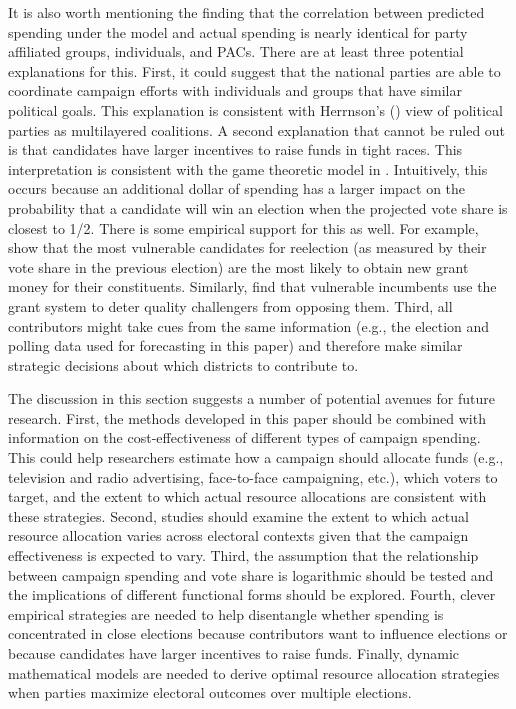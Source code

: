\documentclass[12pt,final,fleqn]{article}
\theoremstyle{plain}
\begin{document}
It is also worth mentioning the finding that the correlation between predicted spending under the model and actual spending is nearly identical for party affiliated groups, individuals, and PACs. There are at least three potential explanations for this. First, it could suggest that the national parties are able to coordinate campaign efforts with individuals and groups that have similar political goals. This explanation is consistent with Herrnson's (\citeyear{herrnson2009roles}) view of political parties as multilayered coalitions. A second explanation that cannot be ruled out is that candidates have larger incentives to raise funds in tight races. This interpretation is consistent with the game theoretic model in \citet{erikson2000equilibria}. Intuitively, this occurs because an additional dollar of spending has a larger impact on the probability that a candidate will win an election when the projected vote share is closest to 1/2. There is some empirical support for this as well. For example, \citet{stein1994congressional} show that the most vulnerable candidates for reelection (as measured by their vote share in the previous election) are the most likely to obtain new grant money for their constituents. Similarly, \citet{bickers1996electoral} find that vulnerable incumbents use the grant system to deter quality challengers from opposing them. Third, all contributors might take cues from the same information (e.g., the election and polling data used for forecasting in this paper) and therefore make similar strategic decisions about which districts to contribute to.

The discussion in this section suggests a number of potential avenues for future research. First, the methods developed in this paper should be combined with information on the cost-effectiveness of different types of campaign spending. This could help researchers estimate how a campaign should allocate funds (e.g., television and radio advertising, face-to-face campaigning, etc.), which voters to target, and the extent to which actual resource allocations are consistent with these strategies. Second, studies should examine the extent to which actual resource allocation varies across electoral contexts given that the campaign effectiveness is expected to vary. Third, the assumption that the relationship between campaign spending and vote share is logarithmic should be tested and the implications of different functional forms should be explored. Fourth, clever empirical strategies are needed to help disentangle whether spending is concentrated in close elections because contributors want to influence elections or because candidates have larger incentives to raise funds. Finally, dynamic mathematical models are needed to derive optimal resource allocation strategies when parties maximize electoral outcomes over multiple elections.  
\end{document}
